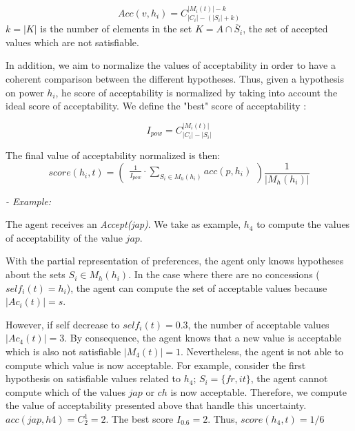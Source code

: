 \documentclass[conference, letterpaper]{IEEEtran}
\begin{document}
		\begin{equation}
		Acc(v, h_i) = C_{|C_i|-(|S_i| + k)}^{|M_i(t)| - k}
		\end{equation}
		$k = |K| $ is the number of elements in the set $K=A \cap \overline S_i$, the set of accepted values which are not satisfiable.
		
		

		
		In addition, we aim to normalize the values of acceptability in order to have a coherent comparison between the different hypotheses. Thus, given a hypothesis on power $h_i$, he score of acceptability is normalized by taking into account the ideal score of acceptability. We define the "best" score of acceptability : 
		
		$$I_{pow} = C_{|C_i|-|S_i|}^{|M_i(t)|}$$
		
		
		The final value of acceptability normalized is then:
		\begin{equation}
		score(h_i, t)= \left( \begin{array}{c}  \frac{1}{I_{pow}} \cdot \sum_{S_i \in M_h(h_i) } acc(p, h_i) 
		\end{array}\right) \frac{1}{| M_h(h_i)|}
		\end{equation}
		
		\textit{- Example:}
		
		The agent receives an \emph{Accept(jap)}. We take as example, $h_4$ to compute the values of acceptability of the value $jap$.

		With the partial representation of preferences, the agent only knows hypotheses about the sets $S_i \in M_h(h_i)$.
		In the case where there are no concessions ($self_i(t)=h_i$), the agent can compute the set of acceptable values because $|Ac_i(t)| = s$.
	
		However, if self decrease to $self_i(t)=0.3$, the number of acceptable values $|Ac_4(t)| = 3$. By consequence, the agent knows that a new value is acceptable which is also not satisfiable $|M_4(t)|=1$. 
		Nevertheless, the agent is not able to compute which value is now acceptable. For example, consider the first hypothesis on satisfiable values related to $h_4$; $S_i = \{fr, it\}$, the agent cannot compute which of the values $jap$ or $ch$ is now acceptable. Therefore, we compute the value of acceptability presented above that handle this uncertainty. 
		$ acc(jap, h4) = C^1_2 = 2$. The best score $I_{0.6}=2$. Thus, $score(h_4,t)= 1/6$
	
\end{document}
